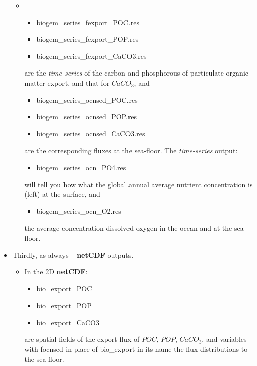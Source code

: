 \begin{itemize}[noitemsep]
\vspace{1mm}
\begin{itemize}[noitemsep]
\item []
\begin{itemize}[noitemsep]
\item [] \textsf{\footnotesize biogem\_series\_fexport\_POC.res}
\item [] \textsf{\footnotesize biogem\_series\_fexport\_POP.res}
\item [] \textsf{\footnotesize biogem\_series\_fexport\_CaCO3.res}
\end{itemize}
\vspace{1mm}
are the \textit{time-series} of the carbon and phosphorous of particulate organic matter export, and that for \(CaCO_{3}\), and
\vspace{1mm}
\begin{itemize}[noitemsep]
\item [] \textsf{\footnotesize biogem\_series\_ocnsed\_POC.res}
\item [] \textsf{\footnotesize biogem\_series\_ocnsed\_POP.res}
\item [] \textsf{\footnotesize biogem\_series\_ocnsed\_CaCO3.res}
\end{itemize}
\vspace{1mm}
are the corresponding fluxes at the sea-floor. The \textit{time-series} output:
\begin{itemize}[noitemsep]
\item [] \textsf{\footnotesize biogem\_series\_ocn\_PO4.res}
\end{itemize}
will tell you how what the global annual average nutrient concentration is (left) at the surface, and
\begin{itemize}[noitemsep]
\item [] \textsf{\footnotesize biogem\_series\_ocn\_O2.res}
\end{itemize}
the average concentration dissolved oxygen in the ocean and at the sea-floor.
\end{itemize}

\vspace{2mm}
\item Thirdly, as always -- \textbf{netCDF} outputs.

\begin{itemize}[noitemsep]
\vspace{1mm}
\item In the 2D \textbf{netCDF}:
\vspace{1mm}
\begin{itemize}[noitemsep]
\item [] \textsf{\footnotesize bio\_export\_POC}
\item [] \textsf{\footnotesize bio\_export\_POP}
\item [] \textsf{\footnotesize bio\_export\_CaCO3}
\end{itemize}
are spatial fields of the export flux of \(POC\), \(POP\), \(CaCO_{3}\), and variables with \textsf{\footnotesize focnsed} in place of \textsf{\footnotesize bio\_export} in its name the flux distributions to the sea-floor.


\end{itemize}
\end{itemize}

